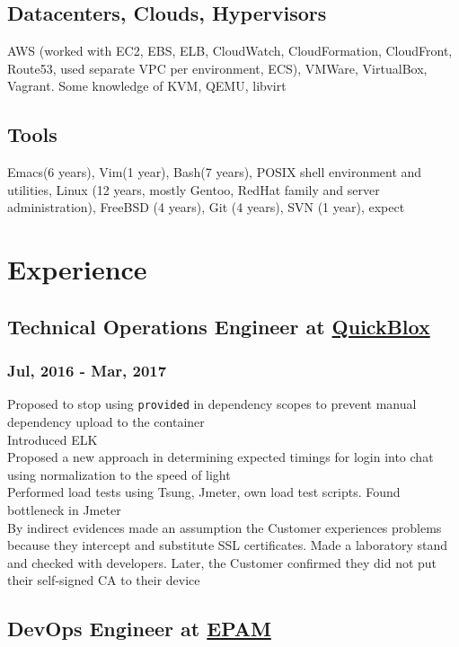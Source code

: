 \documentclass[letterpaper]{article}
\begin{document}
\subsection{Datacenters, Clouds, Hypervisors}
\label{sec-1-7}
AWS (worked with EC2, EBS, ELB, CloudWatch, CloudFormation, CloudFront, Route53, used separate VPC per environment, ECS), VMWare, VirtualBox, Vagrant. Some knowledge of KVM, QEMU, libvirt
\subsection{Tools}
\label{sec-1-8}
Emacs(6 years), Vim(1 year), Bash(7 years), POSIX shell environment and utilities, Linux (12 years, mostly Gentoo, RedHat family and server administration), FreeBSD (4 years), Git (4 years), SVN (1 year), expect

\section{Experience}
\label{sec-2}
\subsection{Technical Operations Engineer at \href{https://quickblox.com}{QuickBlox}}
\label{sec-2-1}
\subsubsection{Jul, 2016 - Mar, 2017}
\label{sec-2-1-1}
Proposed to stop using \verb~provided~ in dependency scopes to prevent manual dependency upload to the container\\
Introduced ELK\\
Proposed a new approach in determining expected timings for login into chat using normalization to the speed of light\\
Performed load tests using Tsung, Jmeter, own load test scripts. Found bottleneck in Jmeter\\
By indirect evidences made an assumption the Customer experiences problems because they intercept and substitute SSL certificates. Made a laboratory stand and checked with developers. Later, the Customer confirmed they did not put their self-signed CA to their device\\
\subsection{DevOps Engineer at \href{https://epam.com}{EPAM}}
\label{sec-2-2}
\end{document}

